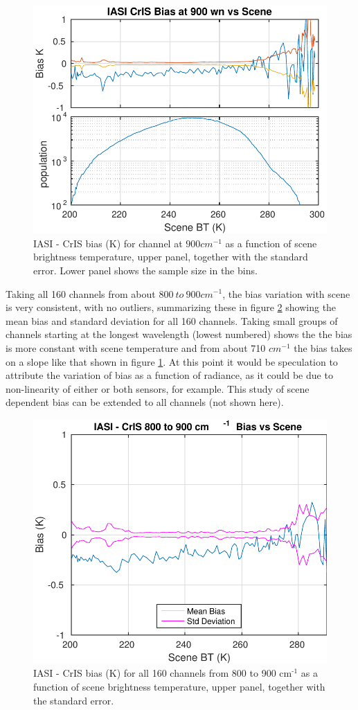 \documentclass[11pt]{article}
\begin{document}
\begin{figure}[htb]
\centering
\includegraphics[width=.6\linewidth]{./figs/IC_jplSNO_Bias_stErr_900wn_vsScene.pdf}
\caption{\label{fig:orgparagraph8}
  IASI - CrIS bias (K) for channel at $900 cm^{-1}$ as a function of scene brightness temperature, upper panel, together with the standard error. Lower panel shows the sample size in the bins.}
\label{fig:X7}
\end{figure}

Taking all 160 channels from about $800\ to\ 900 cm^{-1}$, the bias variation with scene
is very consistent, with no outliers, summarizing these in figure \ref{fig:X8} showing the mean bias and standard deviation for all 160 channels. Taking small groups of channels starting at the longest wavelength (lowest numbered) shows the the bias is more constant with scene temperature and from about 710 \(cm^{-1}\) the bias takes on a slope like that shown in figure \ref{fig:X7}. At this point it would be speculation to attribute the variation of bias as a function of radiance, as it could be due to non-linearity of either or both sensors, for example. This study of scene dependent bias can be extended to all channels (not shown here).

\begin{figure}[htb]
\centering
\includegraphics[width=.6\linewidth]{./figs/IC_jplSNO_Bias_std_LWchns_vsScene.pdf}
\caption{\label{fig:orgparagraph9}
  IASI - CrIS bias (K) for all 160 channels from 800 to 900 cm\(^{\text{-1}}\) as a function of scene brightness temperature, upper panel, together with the standard error.}
\label{fig:X8}
\end{figure}
\end{document}

